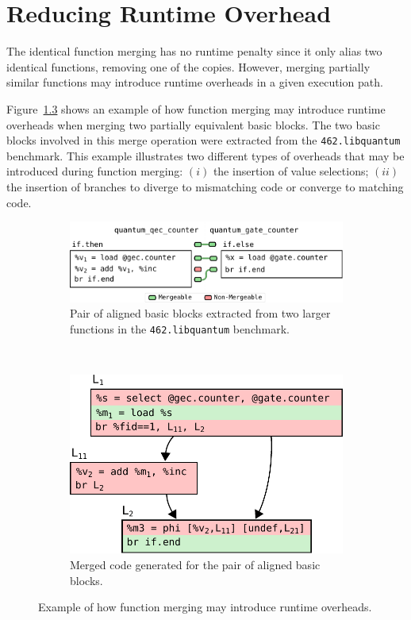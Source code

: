 
\chapter{Reducing Runtime Overhead}

The identical function merging has no runtime penalty since it only alias two identical functions, removing one of the copies.
However, merging partially similar functions may introduce runtime overheads in a given execution path.

Figure~\ref{fig:partially-merged-blocks} shows an example of how function merging may introduce runtime overheads when merging two partially equivalent basic blocks.
The two basic blocks involved in this merge operation were extracted from the \texttt{462.libquantum} benchmark.
This example illustrates two different types of overheads that may be introduced during function merging:
$(i)$ the insertion of value selections;
$(ii)$ the insertion of branches to diverge to mismatching code or converge to matching code.


\begin{figure}[t]
  \centering
  \begin{subfigure}{\textwidth}
    \center
    \includegraphics[scale=0.8]{src/runtime-overhead/figs/partially-merged-blocks-alignment}
    \caption{Pair of aligned basic blocks extracted from two larger functions in the \texttt{462.libquantum} benchmark.}
    \label{fig:partially-merged-blocks-alignment}
  \end{subfigure}
  \\
  \begin{subfigure}{\textwidth}
    \center
    \includegraphics[scale=0.8]{src/runtime-overhead/figs/partially-merged-blocks-codegen}
    \caption{Merged code generated for the pair of aligned basic blocks.}
    \label{fig:partially-merged-blocks-codegen}
  \end{subfigure}
  \caption{Example of how function merging may introduce runtime overheads. }
  \label{fig:partially-merged-blocks}
\end{figure}

